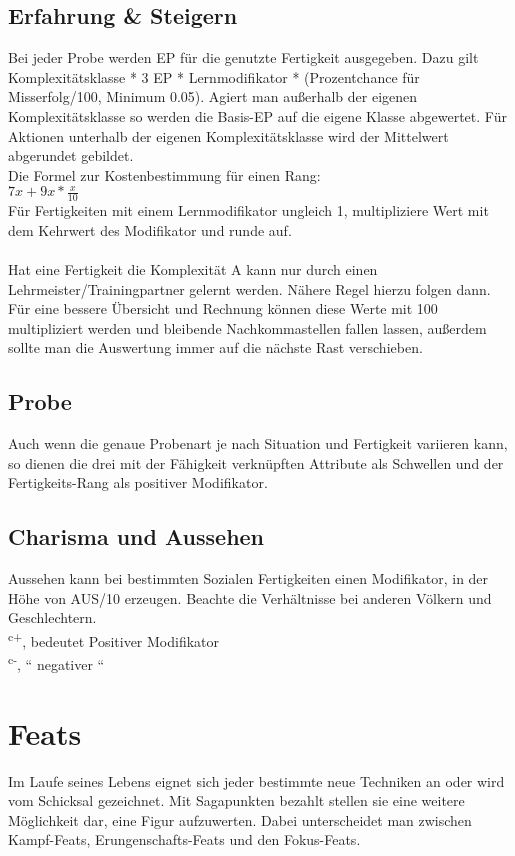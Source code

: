 \documentclass[a4paper,12pt,oneside]{book}
\begin{document}
\section{Erfahrung \& Steigern}
Bei jeder Probe werden EP für die genutzte Fertigkeit ausgegeben. Dazu gilt Komplexitätsklasse * 3 EP * Lernmodifikator * (Prozentchance für Misserfolg/100, Minimum 0.05). Agiert man außerhalb der eigenen Komplexitätsklasse so werden die Basis-EP auf die eigene Klasse abgewertet. Für Aktionen unterhalb der eigenen Komplexitätsklasse wird der Mittelwert abgerundet gebildet.
\\Die Formel zur Kostenbestimmung für einen Rang:
\\$7x+9x*\frac{x}{10}$
\\Für Fertigkeiten mit einem Lernmodifikator ungleich 1, multipliziere Wert mit dem Kehrwert des Modifikator und runde auf.
\\
\\Hat eine Fertigkeit die Komplexität A kann nur durch einen Lehrmeister/Trainingpartner gelernt werden. Nähere Regel hierzu folgen dann.
\\Für eine bessere Übersicht und Rechnung können diese Werte mit 100 multipliziert werden und bleibende Nachkommastellen fallen lassen, außerdem sollte man die Auswertung immer auf die nächste Rast verschieben.
\section{Probe}
Auch wenn die genaue Probenart je nach Situation und Fertigkeit variieren kann, so dienen die drei mit der Fähigkeit verknüpften Attribute als Schwellen und der Fertigkeits-Rang als positiver Modifikator.
\section{Charisma und Aussehen}
Aussehen kann bei bestimmten Sozialen Fertigkeiten einen Modifikator, in der Höhe von AUS/10 erzeugen. Beachte die Verhältnisse bei anderen Völkern und Geschlechtern.
\\\textsuperscript{c+}, bedeutet Positiver Modifikator
\\\textsuperscript{c-}, `` negativer ``

\chapter{Feats}
Im Laufe seines Lebens eignet sich jeder bestimmte neue Techniken an oder wird vom Schicksal gezeichnet. Mit Sagapunkten bezahlt stellen sie eine weitere Möglichkeit dar, eine Figur aufzuwerten. Dabei unterscheidet man zwischen Kampf-Feats, Erungenschafts-Feats und den Fokus-Feats.
\end{document}

